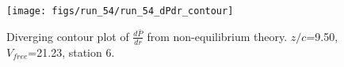 \begin{figure}[H]
\centering
\texttt{[image: figs/run\_54/run\_54\_dPdr\_contour]}
\caption{Diverging contour plot of $\frac{d\bar{P}}{dr}$ from non-equilibrium theory. $z/c$=9.50, $V_{free}$=21.23, station 6.}
\label{fig:run_54_dPdr_contour}
\end{figure}



